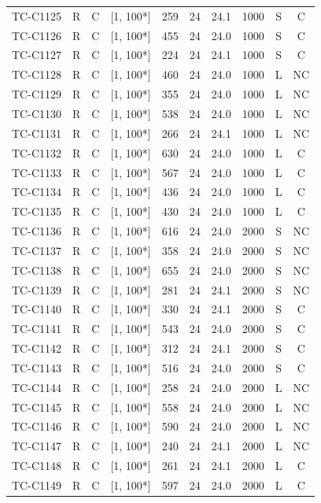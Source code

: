\begin{longtable}{lccccccccc}
TC-C1125 & R & C & [1, 100*] & 259 & 24 & 24.1 & 1000 & S & C \\
TC-C1126 & R & C & [1, 100*] & 455 & 24 & 24.0 & 1000 & S & C \\
TC-C1127 & R & C & [1, 100*] & 224 & 24 & 24.1 & 1000 & S & C \\
TC-C1128 & R & C & [1, 100*] & 460 & 24 & 24.0 & 1000 & L & NC \\
TC-C1129 & R & C & [1, 100*] & 355 & 24 & 24.0 & 1000 & L & NC \\
TC-C1130 & R & C & [1, 100*] & 538 & 24 & 24.0 & 1000 & L & NC \\
TC-C1131 & R & C & [1, 100*] & 266 & 24 & 24.1 & 1000 & L & NC \\
TC-C1132 & R & C & [1, 100*] & 630 & 24 & 24.0 & 1000 & L & C \\
TC-C1133 & R & C & [1, 100*] & 567 & 24 & 24.0 & 1000 & L & C \\
TC-C1134 & R & C & [1, 100*] & 436 & 24 & 24.0 & 1000 & L & C \\
TC-C1135 & R & C & [1, 100*] & 430 & 24 & 24.0 & 1000 & L & C \\
TC-C1136 & R & C & [1, 100*] & 616 & 24 & 24.0 & 2000 & S & NC \\
TC-C1137 & R & C & [1, 100*] & 358 & 24 & 24.0 & 2000 & S & NC \\
TC-C1138 & R & C & [1, 100*] & 655 & 24 & 24.0 & 2000 & S & NC \\
TC-C1139 & R & C & [1, 100*] & 281 & 24 & 24.1 & 2000 & S & NC \\
TC-C1140 & R & C & [1, 100*] & 330 & 24 & 24.1 & 2000 & S & C \\
TC-C1141 & R & C & [1, 100*] & 543 & 24 & 24.0 & 2000 & S & C \\
TC-C1142 & R & C & [1, 100*] & 312 & 24 & 24.1 & 2000 & S & C \\
TC-C1143 & R & C & [1, 100*] & 516 & 24 & 24.0 & 2000 & S & C \\
TC-C1144 & R & C & [1, 100*] & 258 & 24 & 24.0 & 2000 & L & NC \\
TC-C1145 & R & C & [1, 100*] & 558 & 24 & 24.0 & 2000 & L & NC \\
TC-C1146 & R & C & [1, 100*] & 590 & 24 & 24.0 & 2000 & L & NC \\
TC-C1147 & R & C & [1, 100*] & 240 & 24 & 24.1 & 2000 & L & NC \\
TC-C1148 & R & C & [1, 100*] & 261 & 24 & 24.1 & 2000 & L & C \\
TC-C1149 & R & C & [1, 100*] & 597 & 24 & 24.0 & 2000 & L & C \\

\end{longtable}
